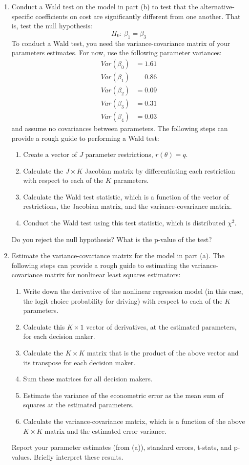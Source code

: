 \documentclass[11pt,letterpaper]{article}
\begin{document}
\begin{enumerate}[label=\alph*., leftmargin=*]
	\item Conduct a Wald test on the model in part (b) to test that the alternative-specific coefficients on cost are significantly different from one another. That is, test the null hypothesis:
	$$H_0 \text{: } \beta_1 = \beta_3$$
	To conduct a Wald test, you need the variance-covariance matrix of your parameters estimates. For now, use the following parameter variances:
	\begin{align*}
		Var(\beta_0) &= 1.61 \\
		Var(\beta_1) &= 0.86 \\
		Var(\beta_2) &= 0.09 \\
		Var(\beta_3) &= 0.31 \\
		Var(\beta_4) &= 0.03
	\end{align*}
	and assume no covariances between parameters. The following steps can provide a rough guide to performing a Wald test:
	\begin{enumerate}[label=\Roman*.]
		\item Create a vector of $J$ parameter restrictions, $r(\theta) = q$.
		\item Calculate the $J \times K$ Jacobian matrix by differentiating each restriction with respect to each of the $K$ parameters.
		\item Calculate the Wald test statistic, which is a function of the vector of restrictions, the Jacobian matrix, and the variance-covariance matrix.
		\item Conduct the Wald test using this test statistic, which is distributed $\chi^2$.
	\end{enumerate}
	Do you reject the null hypothesis? What is the p-value of the test?

	\item Estimate the variance-covariance matrix for the model in part (a). The following steps can provide a rough guide to estimating the variance-covariance matrix for nonlinear least squares estimators:
	\begin{enumerate}[label=\Roman*.]
		\item Write down the derivative of the nonlinear regression model (in this case, the logit choice probability for driving) with respect to each of the $K$ parameters.
		\item Calculate this $K \times 1$ vector of derivatives, at the estimated parameters, for each decision maker.
		\item Calculate the $K \times K$ matrix that is the product of the above vector and its transpose for each decision maker.
		\item Sum these matrices for all decision makers.
		\item Estimate the variance of the econometric error as the mean sum of squares at the estimated parameters.
		\item Calculate the variance-covariance matrix, which is a function of the above $K \times K$ matrix and the estimated error variance.
	\end{enumerate}
	Report your parameter estimates (from (a)), standard errors, t-stats, and p-values. Briefly interpret these results.


\end{enumerate}
\end{document}
